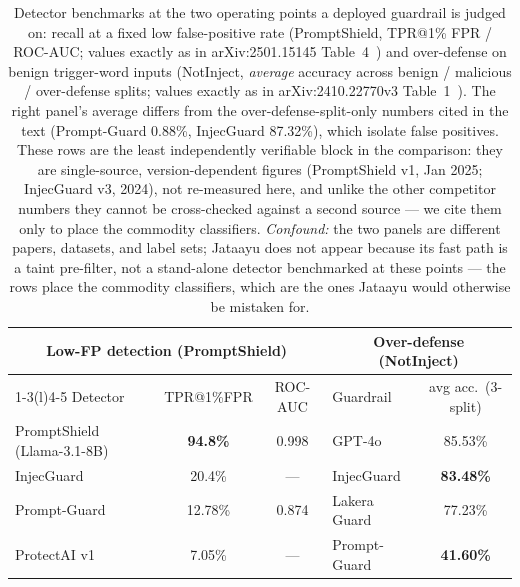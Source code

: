 \documentclass[11pt]{article}
\newcommand{\good}[1]{\textcolor{good}{\textbf{#1}}}
\newcommand{\bad}[1]{\textcolor{crit}{\textbf{#1}}}
\begin{document}
\begin{table}[htbp]\centering\small
\caption{Detector benchmarks at the two operating points a deployed guardrail is judged on:
recall at a fixed low false-positive rate (PromptShield, TPR@1\% FPR / ROC-AUC; values exactly as
in arXiv:2501.15145 Table~4~\cite{promptshield}) and over-defense on benign trigger-word inputs
(NotInject, \emph{average} accuracy across benign / malicious / over-defense splits; values exactly
as in arXiv:2410.22770v3 Table~1~\cite{injecguard}). The right panel's average differs from the
over-defense-split-only numbers cited in the text (Prompt-Guard 0.88\%, InjecGuard 87.32\%), which
isolate false positives. These rows are the least independently verifiable block in the comparison:
they are single-source, version-dependent figures (PromptShield v1, Jan 2025; InjecGuard v3, 2024),
not re-measured here, and unlike the other competitor numbers they cannot be cross-checked against a
second source --- we cite them only to place the commodity classifiers.
\emph{Confound:} the two panels are different papers, datasets, and label sets; Jataayu does not
appear because its fast path is a taint pre-filter, not a stand-alone detector benchmarked at these
points --- the rows place the commodity classifiers, which are the ones Jataayu
would otherwise be mistaken for.}\label{tab:cmp-detbench}
\begin{tabular}{lcc@{\hskip 2em}lc}
\toprule
\multicolumn{3}{c}{Low-FP detection (PromptShield)} & \multicolumn{2}{c}{Over-defense (NotInject)} \\
\cmidrule(r){1-3}\cmidrule(l){4-5}
Detector & TPR@1\%FPR & ROC-AUC & Guardrail & avg acc.\ (3-split) \\
\midrule
PromptShield (Llama-3.1-8B) & \good{94.8\%} & 0.998 & GPT-4o & 85.53\% \\
InjecGuard                  & 20.4\% & --- & InjecGuard & \good{83.48\%} \\
Prompt-Guard                & 12.78\% & 0.874 & Lakera Guard & 77.23\% \\
ProtectAI v1                & 7.05\% & --- & Prompt-Guard & \bad{41.60\%} \\
\bottomrule
\end{tabular}
\end{table}
\end{document}
